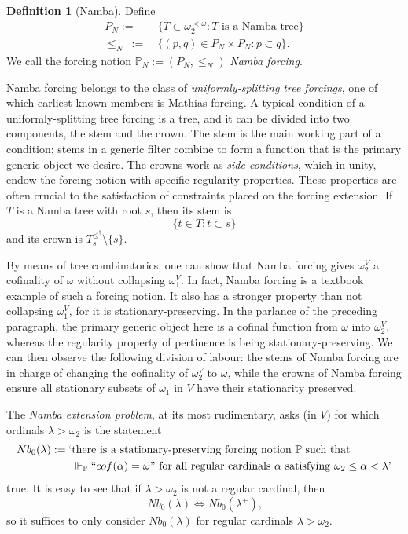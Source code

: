 \documentclass[12pt, twoside]{memoir}
\numberwithin{equation}{section}
\theoremstyle{definition}
\newtheorem{defi}[thm]{Definition}
\theoremstyle{remark}
\theoremstyle{definition}
\theoremstyle{definition}
\theoremstyle{definition}
\theoremstyle{remark}
\begin{document}
\begin{defi}[Namba]
Define
\begin{align*}
    P_N := \ & \{T \subset \omega_2^{< \omega} : T \text{ is a Namba tree}\} \\
    \leq_N \ := \ & \{(p, q) \in P_N \times P_N : p \subset q\} \text{.}
\end{align*}
We call the forcing notion $\mathbb{P}_N := (P_N, \leq_N)$ \emph{Namba forcing}.
\end{defi}

Namba forcing belongs to the class of \emph{uniformly-splitting tree forcings}, one of which earliest-known members is Mathias forcing. A typical condition of a uniformly-splitting tree forcing is a tree, and it can be divided into two components, the stem and the crown. The stem is the main working part of a condition; stems in a generic filter combine to form a function that is the primary generic object we desire. The crowns work as \emph{side conditions}, which in unity, endow the forcing notion with specific regularity properties. These properties are often crucial to the satisfaction of constraints placed on the forcing extension. If $T$ is a Namba tree with root $s$, then its stem is $$\{t \in T : t \subset s\}$$ and its crown is $T_s^{\leq^{\dagger}} \setminus \{s\}$.

By means of tree combinatorics, one can show that Namba forcing gives $\omega_2^V$ a cofinality of $\omega$ without collapsing $\omega_1^V$. In fact, Namba forcing is a textbook example of such a forcing notion. It also has a stronger property than not collapsing $\omega_1^V$, for it is stationary-preserving. In the parlance of the preceding paragraph, the primary generic object here is a cofinal function from $\omega$ into $\omega_2^V$, whereas the regularity property of pertinence is being stationary-preserving. We can then observe the following division of labour: the stems of Namba forcing are in charge of changing the cofinality of $\omega_2^V$ to $\omega$, while the crowns of Namba forcing ensure all stationary subsets of $\omega_1$ in $V$ have their stationarity preserved.

The \textit{Namba extension problem}, at its most rudimentary, asks (in $V$) for which ordinals $\lambda > \omega_2$ is the statement
\begin{align*}
    Nb_0(\lambda) := \text{`} & \text{there is a stationary-preserving forcing notion } \mathbb{P} \text{ such that} \\ 
    & \Vdash_{\mathbb{P}} ``cof(\alpha) = \omega" \text{ for all regular cardinals } \alpha \text{ satisfying } \omega_2 \leq \alpha < \lambda \text{'}
\end{align*} 
true. It is easy to see that if $\lambda > \omega_2$ is not a regular cardinal, then 
\begin{equation*}
    Nb_0(\lambda) \iff Nb_0(\lambda^+) \text{,}
\end{equation*}
so it suffices to only consider $Nb_0(\lambda)$ for regular cardinals $\lambda > \omega_2$.
\end{document}
